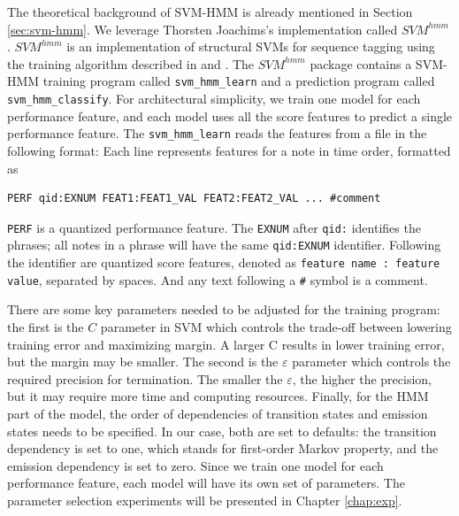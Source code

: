 The theoretical background of SVM-HMM is already mentioned in Section \ref{sec:svm-hmm}. We leverage Thorsten Joachims's implementation called $SVM^{hmm}$ \cite{Joachims2008}. $SVM^{hmm}$ is an implementation of structural SVMs for sequence tagging \cite{svm2003} using the training algorithm described in \cite{svm2005} and \cite{svm2009}. The $SVM^{hmm}$ package contains a SVM-HMM training program called \texttt{svm\_hmm\_learn} and a prediction program called \texttt{svm\_hmm\_classify}. For architectural simplicity, we train one model for each performance feature, and each model uses all the score features to predict a single performance feature. The \texttt{svm\_hmm\_learn} reads the features from a file  in the following format:
Each line represents features for a note in time order, formatted as
\begin{lstlisting}[style=nonumbers]
	PERF qid:EXNUM FEAT1:FEAT1_VAL FEAT2:FEAT2_VAL ... #comment
\end{lstlisting}
\texttt{PERF} is a quantized performance feature. The \texttt{EXNUM} after \texttt{qid:} identifies the phrases; all notes in a phrase will have the same \texttt{qid:EXNUM} identifier. Following the identifier are quantized score features, denoted as \texttt{feature name : feature value}, separated by spaces. And any text following a \texttt{\#} symbol is a comment. %



There are some key parameters needed to be adjusted for the training program: the first is the $C$ parameter in SVM which controls the trade-off between lowering training error and maximizing margin. A larger C results in lower training error, but the margin may be smaller. The second is the $\varepsilon$ parameter which controls the required precision for termination. The smaller the $\varepsilon$, the higher the precision, but it may require more time and computing resources. Finally, for the HMM part of the model, the order of dependencies of transition states and emission states needs to be specified. In our case, both are set to defaults: the transition dependency is set to one, which stands for first-order Markov property, and the emission dependency is set to zero. Since we train one model for each performance feature, each model will have its own set of parameters. The parameter selection experiments will be presented in Chapter \ref{chap:exp}.

